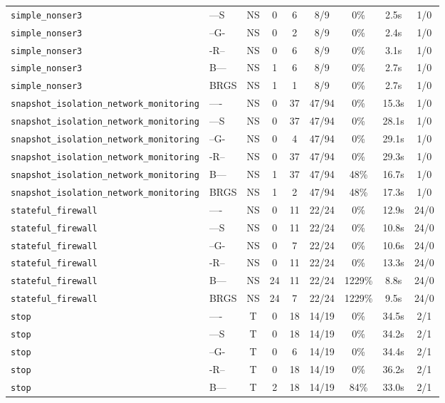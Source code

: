 \begin{tabular}{llccccccc}
\texttt{simple_nonser3} & ---S & NS & 0 & 6 & 8/9 & 0\% & 2.5s & 1/0 \\
\texttt{simple_nonser3} & --G- & NS & 0 & 2 & 8/9 & 0\% & 2.4s & 1/0 \\
\texttt{simple_nonser3} & -R-- & NS & 0 & 6 & 8/9 & 0\% & 3.1s & 1/0 \\
\texttt{simple_nonser3} & B--- & NS & 1 & 6 & 8/9 & 0\% & 2.7s & 1/0 \\
\texttt{simple_nonser3} & BRGS & NS & 1 & 1 & 8/9 & 0\% & 2.7s & 1/0 \\
\texttt{snapshot_isolation_network_monitoring} & ---- & NS & 0 & 37 & 47/94 & 0\% & 15.3s & 1/0 \\
\texttt{snapshot_isolation_network_monitoring} & ---S & NS & 0 & 37 & 47/94 & 0\% & 28.1s & 1/0 \\
\texttt{snapshot_isolation_network_monitoring} & --G- & NS & 0 & 4 & 47/94 & 0\% & 29.1s & 1/0 \\
\texttt{snapshot_isolation_network_monitoring} & -R-- & NS & 0 & 37 & 47/94 & 0\% & 29.3s & 1/0 \\
\texttt{snapshot_isolation_network_monitoring} & B--- & NS & 1 & 37 & 47/94 & 48\% & 16.7s & 1/0 \\
\texttt{snapshot_isolation_network_monitoring} & BRGS & NS & 1 & 2 & 47/94 & 48\% & 17.3s & 1/0 \\
\texttt{stateful_firewall} & ---- & NS & 0 & 11 & 22/24 & 0\% & 12.9s & 24/0 \\
\texttt{stateful_firewall} & ---S & NS & 0 & 11 & 22/24 & 0\% & 10.8s & 24/0 \\
\texttt{stateful_firewall} & --G- & NS & 0 & 7 & 22/24 & 0\% & 10.6s & 24/0 \\
\texttt{stateful_firewall} & -R-- & NS & 0 & 11 & 22/24 & 0\% & 13.3s & 24/0 \\
\texttt{stateful_firewall} & B--- & NS & 24 & 11 & 22/24 & 1229\% & 8.8s & 24/0 \\
\texttt{stateful_firewall} & BRGS & NS & 24 & 7 & 22/24 & 1229\% & 9.5s & 24/0 \\
\texttt{stop} & ---- & T & 0 & 18 & 14/19 & 0\% & 34.5s & 2/1 \\
\texttt{stop} & ---S & T & 0 & 18 & 14/19 & 0\% & 34.2s & 2/1 \\
\texttt{stop} & --G- & T & 0 & 6 & 14/19 & 0\% & 34.4s & 2/1 \\
\texttt{stop} & -R-- & T & 0 & 18 & 14/19 & 0\% & 36.2s & 2/1 \\
\texttt{stop} & B--- & T & 2 & 18 & 14/19 & 84\% & 33.0s & 2/1 \\

\end{tabular}
